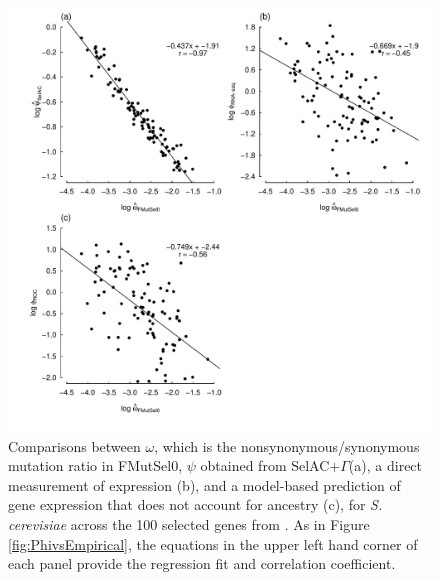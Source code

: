 \documentclass{article}
\newcommand{\selacplusgamma}{SelAC$+\Gamma$\xspace}
\begin{document}
\begin{figure}[H]
  \centering
  \includegraphics[width=0.9\linewidth]{FIGURE_2_MutSelOmega_vs_Us_ROC_Scer_only.pdf}
  \caption{Comparisons between $\omega$, which is the nonsynonymous/synonymous mutation ratio in FMutSel0, $\psi$ obtained from \selacplusgamma (a), a direct measurement of expression (b), and a model-based prediction of gene expression that does not account for ancestry (c), for \emph{S. cerevisiae} across the 100 selected genes from \citet{SalichosAndRokas2013}.  
    As in Figure \ref{fig:PhivsEmpirical}, the equations in the upper left hand corner of each panel provide the regression fit and correlation coefficient.
  } 
  \label{fig:OmegavsPsi}
\end{figure}
\end{document}
